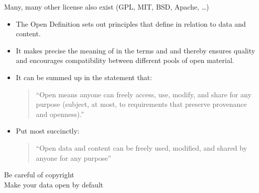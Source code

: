 \documentclass[a4paper,landscape,headrule,footrule,xetex]{foils}
\begin{document}
Many, many other license also exist (GPL, MIT, BSD, Apache, \ldots)

 \begin{itemize}
 \item The Open Definition sets out principles that define 
   in relation to data and content.
 \item It makes precise the meaning of  in the terms 
   and  and thereby ensures quality and encourages
   compatibility between different pools of open material.
 \item It can be summed up in the statement that:
   \begin{quote}
     “Open means anyone can freely access, use, modify, and share for
     any purpose (subject, at most, to requirements that preserve
     provenance and openness).”
   \end{quote}
 \item Put most succinctly:
   \begin{quote}
     “Open data and content can be freely used, modified, and shared
     by anyone for any purpose”
   \end{quote}
 \end{itemize}

 

\begin{center}
  Be careful of copyright
  \\ Make your data open by default
\end{center}


\end{document}
